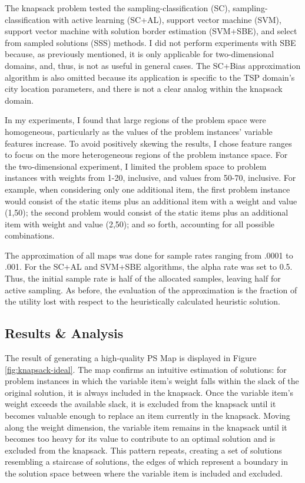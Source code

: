 The knapsack problem tested the sampling-classification (SC), sampling-classification with active learning (SC+AL), support vector machine (SVM), support vector machine with solution border estimation (SVM+SBE), and select from sampled solutions (SSS) methods.  I did not perform experiments with SBE because, as previously mentioned, it is only applicable for two-dimensional domains, and, thus, is not as useful in general cases.  The SC+Bias approximation algorithm is also omitted because its application is specific to the TSP domain's city location parameters, and there is not a clear analog within the knapsack domain.

In my experiments, I found that large regions of the problem space were homogeneous, particularly as the values of the problem instances' variable features increase.  To avoid positively skewing the results, I chose feature ranges to focus on the more heterogeneous regions of the problem instance space.  For the two-dimensional experiment, I limited the problem space to problem instances with  weights from  1-20, inclusive, and values from 50-70, inclusive.  For example, when considering only one additional item, the first problem instance would consist of the static items plus an additional item with a weight and value (1,50); the second problem would consist of the static items plus an additional item with weight and value (2,50); and so forth, accounting for all possible combinations.

The approximation of all maps was done for  sample rates ranging from .0001 to .001.  For the SC+AL and SVM+SBE algorithms, the alpha rate was set to 0.5.  Thus, the initial sample rate is half of the allocated samples, leaving half for active sampling.  As before, the evaluation of the approximation is the fraction of the utility lost with respect to the heuristically calculated heuristic solution.




\subsection{Results \& Analysis}

The result of generating a high-quality PS Map is displayed in Figure \ref{fig:knapsack-ideal}.  The map confirms an intuitive estimation of solutions: for problem instances in which the variable item's weight falls within the slack of the  original solution, it is always included in the knapsack.  Once the variable item's weight exceeds the available slack, it is excluded from the knapsack until it becomes valuable enough to replace an item currently in the knapsack.  Moving along the weight dimension, the variable item remains in the knapsack until it becomes too heavy for its value to contribute to an optimal solution and is excluded from the knapsack.  This pattern repeats, creating a set of solutions resembling a staircase of solutions, the edges of which represent a boundary in the solution space between where the variable item is included and excluded.

